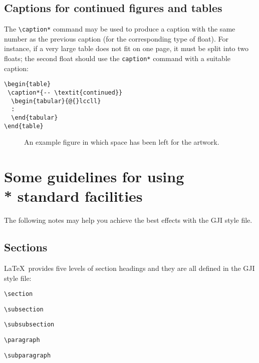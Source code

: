 \subsection{Captions for continued figures and tables}

The \verb"\caption*" command may be used to produce a caption with the same
number as the previous caption (for the corresponding type of float). For
instance, if a very large table does not fit on one page, it must be split into
two floats; the second float should use the \verb"caption*" command with a
suitable caption:
\begin{verbatim}
\begin{table}
 \caption*{-- \textit{continued}}
  \begin{tabular}{@{}lccll}
  :
  \end{tabular}
\end{table}
\end{verbatim}

 \begin{figure}
     \vspace{5.5cm}
     \caption{An example figure in which space has been left for the artwork.}\label{sample-figure}
  \end{figure}

\section[]{Some guidelines for using\\* standard facilities}

The following notes may help you achieve the best effects with the GJI style
file.

\subsection{Sections}

\LaTeX\ provides five levels of section headings and they are all defined in the
GJI style file:
\begin{description}
  \item \verb"\section"
  \item \verb"\subsection"
  \item \verb"\subsubsection"
  \item \verb"\paragraph"
  \item \verb"\subparagraph"
\end{description}

